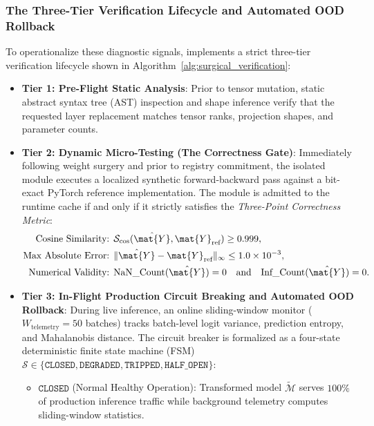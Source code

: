 \subsubsection{The Three-Tier Verification Lifecycle and Automated OOD Rollback}
\label{sec:three_tier_verification}

To operationalize these diagnostic signals, \neuralops{} implements a strict three-tier verification lifecycle shown in Algorithm~\ref{alg:surgical_verification}:

\begin{itemize}
    \item \textbf{Tier 1: Pre-Flight Static Analysis}: Prior to tensor mutation, static abstract syntax tree (AST) inspection and shape inference verify that the requested layer replacement matches tensor ranks, projection shapes, and parameter counts.
    \item \textbf{Tier 2: Dynamic Micro-Testing (The Correctness Gate)}: Immediately following weight surgery and prior to registry commitment, the isolated module executes a localized synthetic forward-backward pass against a bit-exact PyTorch reference implementation. The module is admitted to the runtime cache if and only if it strictly satisfies the \emph{Three-Point Correctness Metric}:
    \begin{align}
    \text{Cosine Similarity: } & \mathcal{S}_{\cos}(\hat{\mat{Y}}, \mat{Y}_{\text{ref}}) \ge 0.999, \label{eq:gate_cosine} \\
    \text{Max Absolute Error: } & \|\hat{\mat{Y}} - \mat{Y}_{\text{ref}}\|_\infty \le 1.0 \times 10^{-3}, \label{eq:gate_maxerr} \\
    \text{Numerical Validity: } & \text{NaN\_Count}(\hat{\mat{Y}}) = 0 \quad \text{and} \quad \text{Inf\_Count}(\hat{\mat{Y}}) = 0. \label{eq:gate_nan}
    \end{align}
    \item \textbf{Tier 3: In-Flight Production Circuit Breaking and Automated OOD Rollback}: During live inference, an online sliding-window monitor ($W_{\text{telemetry}} = 50$ batches) tracks batch-level logit variance, prediction entropy, and Mahalanobis distance. The circuit breaker is formalized as a four-state deterministic finite state machine (FSM) $\mathcal{S} \in \{\mathtt{CLOSED}, \mathtt{DEGRADED}, \mathtt{TRIPPED}, \mathtt{HALF\_OPEN}\}$:
    \begin{itemize}
        \item $\mathtt{CLOSED}$ (Normal Healthy Operation): Transformed model $\widetilde{\mathcal{M}}$ serves $100\%$ of production inference traffic while background telemetry computes sliding-window statistics.

\end{itemize}
\end{itemize}
